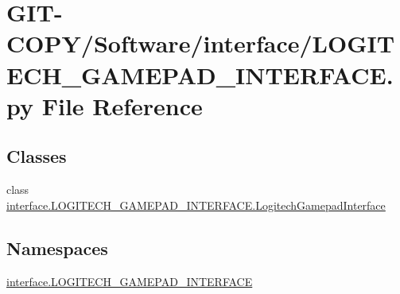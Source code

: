 \hypertarget{GIT-COPY_2Software_2interface_2LOGITECH__GAMEPAD__INTERFACE_8py}{}\section{G\+I\+T-\/\+C\+O\+P\+Y/\+Software/interface/\+L\+O\+G\+I\+T\+E\+C\+H\+\_\+\+G\+A\+M\+E\+P\+A\+D\+\_\+\+I\+N\+T\+E\+R\+F\+A\+C\+E.py File Reference}
\label{GIT-COPY_2Software_2interface_2LOGITECH__GAMEPAD__INTERFACE_8py}
\subsection*{Classes}
\begin{DoxyCompactItemize}
\item 
class \hyperlink{classinterface_1_1LOGITECH__GAMEPAD__INTERFACE_1_1LogitechGamepadInterface}{interface.\+L\+O\+G\+I\+T\+E\+C\+H\+\_\+\+G\+A\+M\+E\+P\+A\+D\+\_\+\+I\+N\+T\+E\+R\+F\+A\+C\+E.\+Logitech\+Gamepad\+Interface}
\end{DoxyCompactItemize}
\subsection*{Namespaces}
\begin{DoxyCompactItemize}
\item 
 \hyperlink{namespaceinterface_1_1LOGITECH__GAMEPAD__INTERFACE}{interface.\+L\+O\+G\+I\+T\+E\+C\+H\+\_\+\+G\+A\+M\+E\+P\+A\+D\+\_\+\+I\+N\+T\+E\+R\+F\+A\+C\+E}
\end{DoxyCompactItemize}
